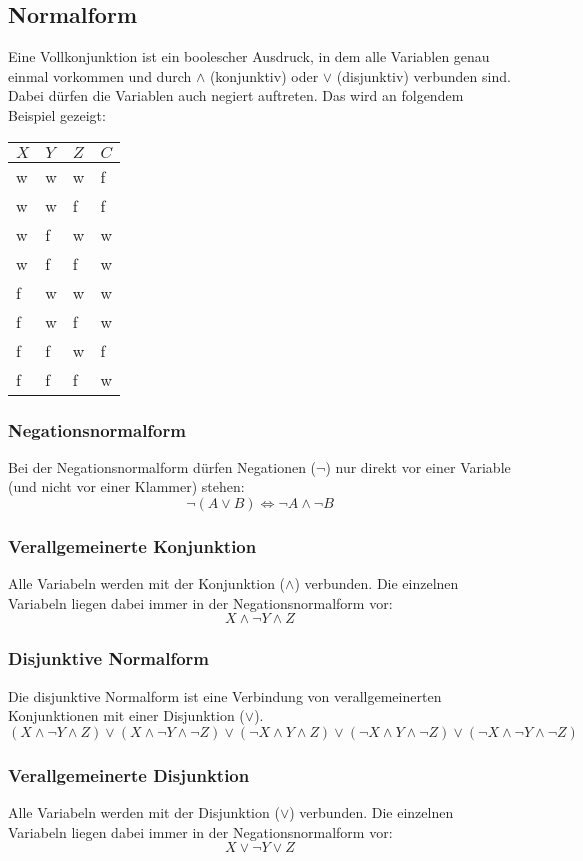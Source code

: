 \subsection{Normalform}
Eine Vollkonjunktion ist ein boolescher Ausdruck, in dem alle Variablen genau einmal vorkommen und durch $\wedge$ (konjunktiv) oder $\vee$ (disjunktiv) verbunden sind. Dabei dürfen die Variablen auch negiert auftreten.
Das wird an folgendem Beispiel gezeigt:

\begin{tabular}{|l|l|l||l|}
  \hline
  $X$ & $Y$ & $Z$ & $C$ \\
  \hline
  w & w & w & f \\
  w & w & f & f \\
  w & f & w & w \\
  w & f & f & w \\
  f & w & w & w \\
  f & w & f & w \\
  f & f & w & f \\
  f & f & f & w \\
  \hline
\end{tabular}


\subsubsection{Negationsnormalform}
  Bei der Negationsnormalform dürfen Negationen ($\neg$) nur direkt vor
  einer Variable (und nicht vor einer Klammer) stehen:
  \[\neg (A \vee B) \Leftrightarrow \neg A \wedge \neg B\]
\subsubsection{Verallgemeinerte Konjunktion}
  Alle Variabeln werden mit der Konjunktion ($\wedge$) verbunden.
  Die einzelnen Variabeln liegen dabei immer in der Negationsnormalform vor:
  \[ X \wedge \neg Y \wedge Z\]

\subsubsection{Disjunktive Normalform}
  Die disjunktive Normalform ist eine Verbindung von verallgemeinerten
  Konjunktionen mit einer Disjunktion ($\vee$).
  \[ (X \wedge \neg Y \wedge Z) \vee (X \wedge \neg Y \wedge \neg Z) \vee (\neg X \wedge Y \wedge Z)
    \vee (\neg X \wedge Y \wedge \neg Z) \vee (\neg X \wedge \neg Y \wedge \neg Z)\]
\subsubsection{Verallgemeinerte Disjunktion}
  Alle Variabeln werden mit der Disjunktion ($\vee$) verbunden. 
  Die einzelnen Variabeln liegen dabei immer in der Negationsnormalform vor:
  \[ X \vee \neg Y \vee Z\]
